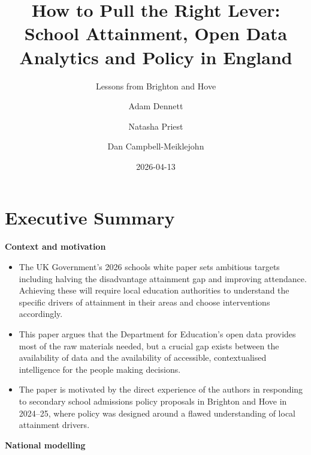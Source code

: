 \documentclass[
  11pt,
]{article}
\title{How to Pull the Right Lever: School Attainment, Open Data
Analytics and Policy in England}
\subtitle{Lessons from Brighton and Hove}
\author{Adam Dennett \and Natasha Priest \and Dan Campbell-Meiklejohn}
\date{2026-04-13}
\providecommand{\tightlist}{%
  \setlength{\itemsep}{0pt}\setlength{\parskip}{0pt}}
\renewcommand*\contentsname{Table of contents}
\newcommand\contentsname{Table of contents}
\begin{document}
\maketitle

\renewcommand*\contentsname{Table of contents}
{
\hypersetup{linkcolor=}
\setcounter{tocdepth}{3}
\tableofcontents
}

\section*{Executive Summary}\label{executive-summary}

\textbf{Context and motivation}

\begin{itemize}
\tightlist
\item
  The UK Government's 2026 schools white paper sets ambitious targets
  including halving the disadvantage attainment gap and improving
  attendance. Achieving these will require local education authorities
  to understand the specific drivers of attainment in their areas and
  choose interventions accordingly.
\item
  This paper argues that the Department for Education's open data
  provides most of the raw materials needed, but a crucial gap exists
  between the availability of data and the availability of accessible,
  contextualised intelligence for the people making decisions.
\item
  The paper is motivated by the direct experience of the authors in
  responding to secondary school admissions policy proposals in Brighton
  and Hove in 2024--25, where policy was designed around a flawed
  understanding of local attainment drivers.
\end{itemize}

\textbf{National modelling}
\end{document}
